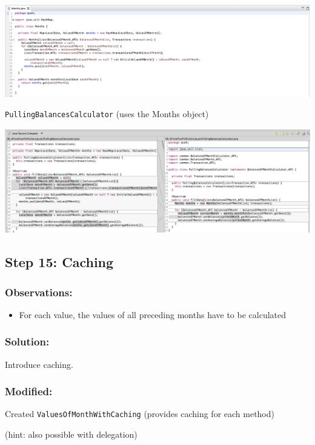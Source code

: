 \documentclass[a4paper,fleqn,titlepage,11pt]{article}
\begin{document}
\includegraphics[width=1\textwidth]{CompareViews/14-1.png}

\texttt{PullingBalancesCalculator} (uses the Months object)

\includegraphics[width=1\textwidth]{CompareViews/13-14-2.png}

\subsection*{Step 15: Caching}

\subsubsection*{Observations:}
\begin{itemize}
\item For each value, the values of all preceding months have to be calculated
\end{itemize}

\subsubsection*{Solution:}

Introduce caching.

\subsubsection*{Modified:}

Created \texttt{ValuesOfMonthWithCaching} (provides caching for each method)

(hint: also possible with delegation)
\end{document}
